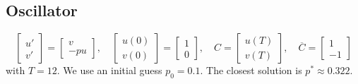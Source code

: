 \documentclass[english,12pt,a4paper]{article}
\begin{document}
%
\subsection{Oscillator}\label{subsec:}
%
%
\begin{equation}\label{eq:}
\begin{bmatrix}
u'\\ v'
\end{bmatrix}
=
\begin{bmatrix}
v\\ -p u
\end{bmatrix}
,\quad 
\begin{bmatrix}
u(0)\\ v(0)
\end{bmatrix}
=
\begin{bmatrix}
1\\ 0
\end{bmatrix},\quad
C = 
\begin{bmatrix}
u(T)\\ v(T)
\end{bmatrix},\quad
\overline{C} = 
\begin{bmatrix}
1\\ -1
\end{bmatrix}
\end{equation}
%
with $T=12$. We use an initial guess $p_0=0.1$. The closest solution is $p^*\approx0.322$.
\end{document}
